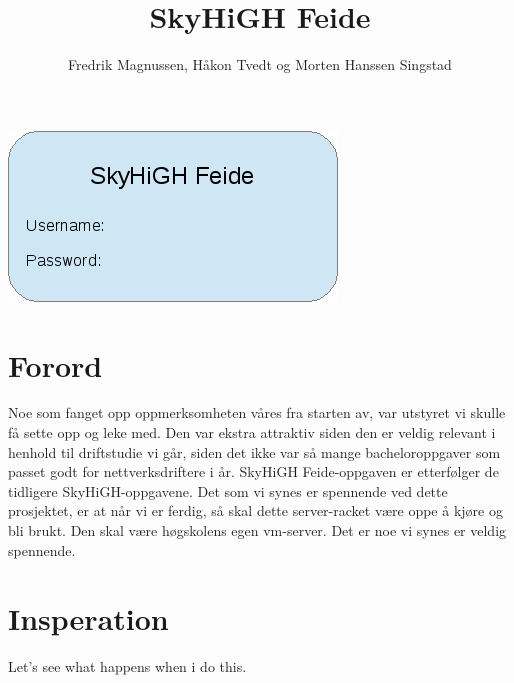 \documentclass[12pt,a4paper]{article}
\begin{document}
\title{SkyHiGH Feide}
\author{Fredrik Magnussen, Håkon Tvedt og Morten Hanssen Singstad}
\maketitle 
\begin{center}
\includegraphics[scale=1]{frontpageimage.png}
\end{center}

\newpage
\tableofcontents


\newpage
\section{Forord}
Noe som fanget opp oppmerksomheten våres fra starten av, var utstyret vi skulle få sette opp og leke med. Den var ekstra attraktiv siden den er veldig relevant i henhold til driftstudie vi går, siden det ikke var så mange bacheloroppgaver som passet godt for nettverksdriftere i år. SkyHiGH Feide-oppgaven er etterfølger de tidligere SkyHiGH-oppgavene. Det som vi synes er spennende ved dette prosjektet, er at når vi er ferdig, så skal dette server-racket være oppe å kjøre og bli brukt. Den skal være høgskolens egen vm-server. Det er noe vi synes er veldig spennende.

\section{Insperation}
Let's see what happens when i do this.
\end{document}
